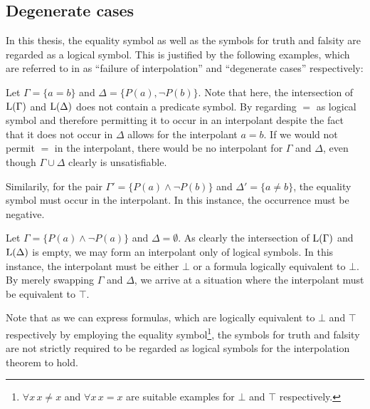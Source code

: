 \subsection{Degenerate cases}
In this thesis, the equality symbol as well as the symbols for truth and falsity are regarded as a logical symbol. 
This is justified by the following examples, which are referred to in \cite[Example 20.2 and 20.4]{boolos2007computability} as ``failure of interpolation'' and ``degenerate cases'' respectively:

\begin{exa}
	\label{exa:degenerate_equality}
	Let $\Gamma = \{ a=b \} $ and $\Delta = \{P(a), \lnot P(b)\}$.
	Note that here, the intersection of $\operatorname{L}(\Gamma)$ and $\operatorname{L}(\Delta)$ does not contain a predicate symbol.
	By regarding $=$ as logical symbol and therefore permitting it to occur in an interpolant despite the fact that it does not occur in $\Delta$ allows for the interpolant $a=b$.
	If we would not permit $=$ in the interpolant, there would be no interpolant for $\Gamma$ and $\Delta$, even though $\Gamma \cup \Delta$ clearly is unsatisfiable.

	Similarily, for the pair $\Gamma' = \{ P(a) \land \lnot P(b) \}$ and $\Delta' = \{a\neq b\}$, the equality symbol must occur in the interpolant. In this instance, the occurrence must be negative.
\end{exa}

\begin{exa}
	Let $\Gamma = \{ P(a) \land \lnot P(a) \} $ and $\Delta = \emptyset$.
	As clearly the intersection of $\operatorname{L}(\Gamma)$ and $\operatorname{L}(\Delta)$ is empty, we may form an interpolant only of logical symbols.
	In this instance, the interpolant must be either $\bot$ or a formula logically equivalent to $\bot$.
	By merely swapping $\Gamma$ and $\Delta$, we arrive at a situation where the interpolant must be equivalent to $\top$.

	Note that as we can express formulas, which are logically equivalent to $\bot$ and $\top$ respectively by employing the equality symbol\footnote{$\forall x\,x\neq x$ and $\forall x\,x=x$ are suitable examples for $\bot$ and $\top$ respectively.}, the symbols for truth and falsity are not strictly required to be regarded as logical symbols for the interpolation theorem to hold.
\end{exa}
